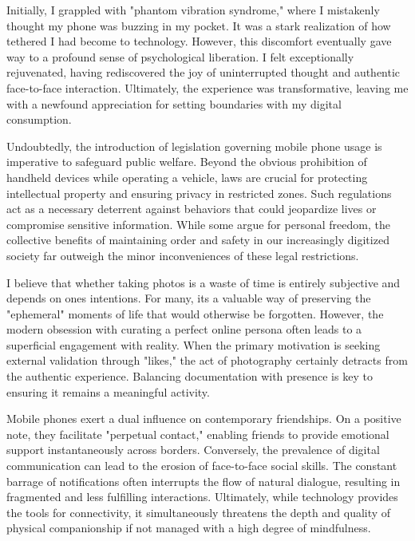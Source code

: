 Initially, I grappled with "phantom vibration syndrome," where I
mistakenly thought my phone was buzzing in my pocket. It was a stark
realization of how tethered I had become to technology. However, this
discomfort eventually gave way to a profound sense of psychological
liberation. I felt exceptionally rejuvenated, having rediscovered the
joy of uninterrupted thought and authentic face-to-face interaction.
Ultimately, the experience was transformative, leaving me with a
newfound appreciation for setting boundaries with my digital
consumption.



Undoubtedly, the introduction of legislation governing mobile phone
usage is imperative to safeguard public welfare. Beyond the obvious
prohibition of handheld devices while operating a vehicle, laws are
crucial for protecting intellectual property and ensuring privacy in
restricted zones. Such regulations act as a necessary deterrent against
behaviors that could jeopardize lives or compromise sensitive
information. While some argue for personal freedom, the collective
benefits of maintaining order and safety in our increasingly digitized
society far outweigh the minor inconveniences of these legal
restrictions.


I believe that whether taking photos is a waste of time is entirely
subjective and depends on one\textquotesingle s intentions. For many,
it\textquotesingle s a valuable way of preserving the "ephemeral"
moments of life that would otherwise be forgotten. However, the modern
obsession with curating a perfect online persona often leads to a
superficial engagement with reality. When the primary motivation is
seeking external validation through "likes," the act of photography
certainly detracts from the authentic experience. Balancing
documentation with presence is key to ensuring it remains a meaningful
activity.


Mobile phones exert a dual influence on contemporary friendships. On a
positive note, they facilitate "perpetual contact," enabling friends to
provide emotional support instantaneously across borders. Conversely,
the prevalence of digital communication can lead to the erosion of
face-to-face social skills. The constant barrage of notifications often
interrupts the flow of natural dialogue, resulting in fragmented and
less fulfilling interactions. Ultimately, while technology provides the
tools for connectivity, it simultaneously threatens the depth and
quality of physical companionship if not managed with a high degree of
mindfulness.

